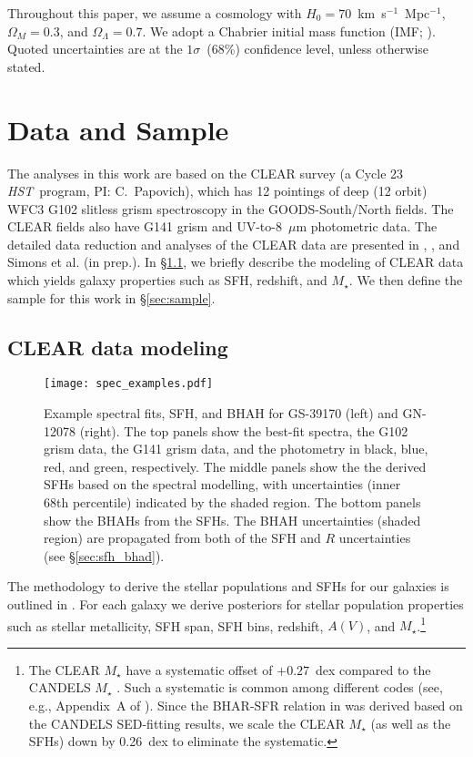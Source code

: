 \documentclass[twocolumn,twocolappendix,times]{aastex63}
\newcommand{\hst}{{\it HST\/}}       %
\newcommand{\mstar}{M_{\star}} %
\newcommand{\fst}[1]{#1}
\begin{document}
\begin{CJK*}{UTF8}{gbsn}
Throughout this paper, we assume a cosmology with
$H_0=70$~km~s$^{-1}$~Mpc$^{-1}$, $\Omega_M=0.3$,
and $\Omega_{\Lambda}=0.7$.
We adopt a Chabrier initial mass function (IMF;
\hbox{\citealt{chabrier03}}).
Quoted uncertainties are at the $1\sigma$\ (68\%)
confidence level, unless otherwise stated.

\section{Data and Sample}\label{sec:data}
The analyses in this work are based on the CLEAR
survey (a Cycle 23 \hst\ program, PI: C.~Papovich), which has 12
pointings of deep (12 orbit) WFC3 G102 slitless grism 
spectroscopy in the GOODS-South/North fields.
The CLEAR fields also have G141 grism and UV-to-8~$\mu$m photometric data.
The detailed data reduction and analyses of the CLEAR data are presented
in \cite{estrada_carpenter19}, \cite{estrada_carpenter20}, and Simons et al. (in prep.). 
In \S\ref{sec:sfh}, we briefly describe the modeling of CLEAR data which 
yields galaxy properties such as SFH, redshift, and $\mstar$. 
We then define the sample for this work in \S\ref{sec:sample}.

\subsection{CLEAR data modeling}
\label{sec:sfh}
\begin{figure*}
    \centering
	\texttt{[image: spec\_examples.pdf]}
    \caption{\fst{Example spectral fits, SFH, and BHAH for GS-39170 (left) and GN-12078 (right).
    The top panels show the best-fit spectra, the G102 grism data, the G141 grism data, and the photometry in black, blue, red, and green, respectively. 
    The middle panels show the the derived SFHs based on the spectral modelling, with uncertainties (inner 68th percentile) indicated by the shaded region.
    The bottom panels show the BHAHs from the SFHs. 
    The BHAH uncertainties (shaded region) are propagated from both of the SFH and $R$ uncertainties (see \S\ref{sec:sfh_bhad}).
    } }
    \label{fig:spec_x}
\end{figure*}

The methodology to derive the stellar populations and SFHs for our galaxies is outlined
in \cite{estrada_carpenter19, estrada_carpenter20}. For each galaxy we derive posteriors for
stellar population properties such as stellar metallicity, SFH span, SFH bins, redshift, $A(V)$, and 
$\mstar$.\footnote{The CLEAR $\mstar$ have a systematic offset of $+0.27$~dex compared to the 
CANDELS $\mstar$ \citep{santini15, barro19}.
Such a systematic is common among different codes (see, e.g., Appendix~A of \citealt{ni21}).
Since the BHAR-SFR relation in \cite{yang19} was derived based on the CANDELS SED-fitting results,  
we scale the CLEAR $\mstar$ (as well as the SFHs) down by 0.26~dex to eliminate the systematic.   
}


\end{CJK*}
\end{document}

